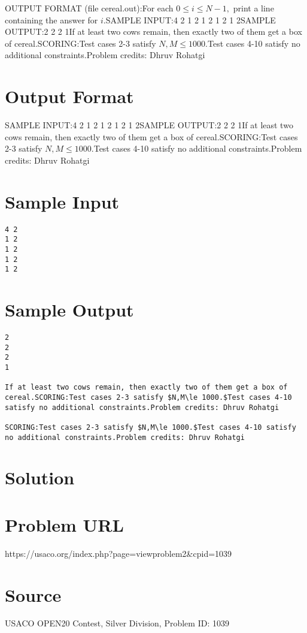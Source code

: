 \documentclass[12pt]{article}
\begin{document}
OUTPUT FORMAT (file cereal.out):For each $0\le i\le N-1,$ print a line containing the answer for $i.$SAMPLE INPUT:4 2
1 2
1 2
1 2
1 2SAMPLE OUTPUT:2
2
2
1If at least two cows remain, then exactly two of them get a box of cereal.SCORING:Test cases 2-3 satisfy $N,M\le 1000.$Test cases 4-10 satisfy no additional constraints.Problem credits: Dhruv Rohatgi

\section*{Output Format}
SAMPLE INPUT:4 2
1 2
1 2
1 2
1 2SAMPLE OUTPUT:2
2
2
1If at least two cows remain, then exactly two of them get a box of cereal.SCORING:Test cases 2-3 satisfy $N,M\le 1000.$Test cases 4-10 satisfy no additional constraints.Problem credits: Dhruv Rohatgi

\section*{Sample Input}
\begin{verbatim}
4 2
1 2
1 2
1 2
1 2
\end{verbatim}

\section*{Sample Output}
\begin{verbatim}
2
2
2
1

If at least two cows remain, then exactly two of them get a box of cereal.SCORING:Test cases 2-3 satisfy $N,M\le 1000.$Test cases 4-10 satisfy no additional constraints.Problem credits: Dhruv Rohatgi

SCORING:Test cases 2-3 satisfy $N,M\le 1000.$Test cases 4-10 satisfy no additional constraints.Problem credits: Dhruv Rohatgi
\end{verbatim}

\section*{Solution}


\section*{Problem URL}
https://usaco.org/index.php?page=viewproblem2&cpid=1039

\section*{Source}
USACO OPEN20 Contest, Silver Division, Problem ID: 1039
\end{document}
